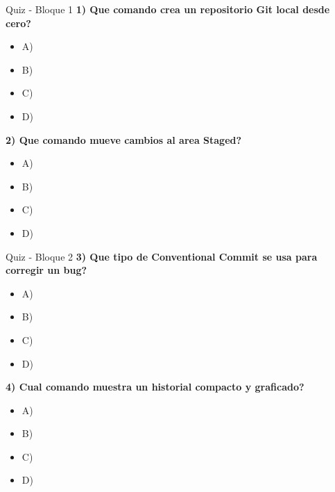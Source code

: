 \documentclass[aspectratio=169]{beamer}
\begin{document}
\begin{frame}{Quiz - Bloque 1}
	\small
	\textbf{1) Que comando crea un repositorio Git local desde cero?}
	\begin{itemize}
		\item A) 
		\item B) 
		\item C) 
		\item D) 
	\end{itemize}

	\textbf{2) Que comando mueve cambios al area Staged?}
	\begin{itemize}
		\item A) 
		\item B) 
		\item C) 
		\item D) 
	\end{itemize}
\end{frame}

\begin{frame}{Quiz - Bloque 2}
	\small
	\textbf{3) Que tipo de Conventional Commit se usa para corregir un bug?}
	\begin{itemize}
		\item A) 
		\item B) 
		\item C) 
		\item D) 
	\end{itemize}

	\textbf{4) Cual comando muestra un historial compacto y graficado?}
	\begin{itemize}
		\item A) 
		\item B) 
		\item C) 
		\item D) 
	\end{itemize}
\end{frame}
\end{document}
